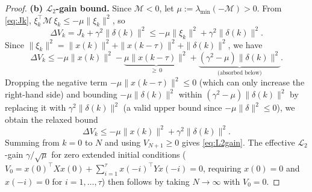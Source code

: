 \documentclass[10pt]{amsart}
\numberwithin{equation}{section}
\begin{document}
\begin{proof}
\textbf{(b) $\mathcal{L}_2$-gain bound.}
Since $\mathcal{M} < 0$, let $\mu := \lambda_{\min}(-\mathcal{M}) > 0$. From
\eqref{eq:Jk}, $\xi_k^\top \mathcal{M}\,\xi_k \leq -\mu\|\xi_k\|^2$, so
\[
\Delta V_k = J_k + \gamma^2\|\delta(k)\|^2
           \leq -\mu\|\xi_k\|^2 + \gamma^2\|\delta(k)\|^2.
\]
Since $\|\xi_k\|^2 = \|x(k)\|^2 + \|x(k-\tau)\|^2 + \|\delta(k)\|^2$, we have
\[
\Delta V_k \leq -\mu\|x(k)\|^2
              - \underbrace{\mu\|x(k-\tau)\|^2}_{\geq\,0}
              + \underbrace{(\gamma^2 - \mu)\|\delta(k)\|^2}_{\text{(absorbed below)}}.
\]
Dropping the negative term $-\mu\|x(k-\tau)\|^2 \leq 0$ (which can only increase the
right-hand side) and bounding $-\mu\|\delta(k)\|^2$ within $(\gamma^2-\mu)\|\delta(k)\|^2$
by replacing it with $\gamma^2\|\delta(k)\|^2$ (a valid upper bound since
$-\mu\|\delta\|^2 \leq 0$), we obtain the relaxed bound
\begin{equation}\label{eq:Jk_bound}
  \Delta V_k \leq -\mu\|x(k)\|^2 + \gamma^2\|\delta(k)\|^2.
\end{equation}
Summing from $k=0$ to $N$ and using $V_{N+1} \geq 0$ gives \eqref{eq:L2gain}.
The effective $\mathcal{L}_2$-gain $\gamma/\sqrt{\mu}$ for zero extended initial
conditions ($V_0 = x(0)^\top X x(0) + \sum_{i=1}^\tau x(-i)^\top Y x(-i) = 0$,
requiring $x(0)=0$ and $x(-i)=0$ for $i=1,\ldots,\tau$) then follows by taking
$N \to \infty$ with $V_0 = 0$.
\end{proof}
\end{document}
